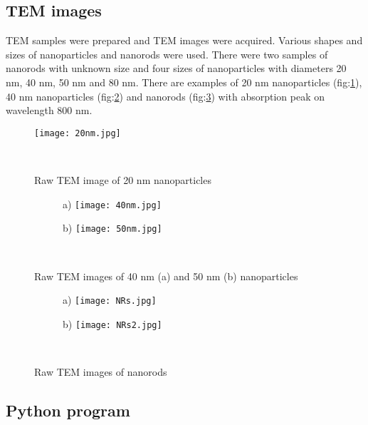 \pagestyle{plain}

\subsection{TEM images}\label{TEM_images}

TEM samples were prepared and TEM images were acquired. Various shapes and sizes of nanoparticles and nanorods were used. There were two samples of nanorods with unknown size and four sizes of nanoparticles with diameters 20 nm, 40 nm, 50 nm and 80 nm. There are examples of 20 nm nanoparticles (fig:\ref{fig:20nm}), 40 nm nanoparticles (fig:\ref{fig:40nm}) and nanorods (fig:\ref{fig:NRs}) with absorption peak on wavelength 800 nm.

\begin{figure}[h!]
\begin{center}
    \texttt{[image: 20nm.jpg]}
    \caption{Raw TEM image of 20 nm nanoparticles}~\label{fig:20nm}
\end{center}
\end{figure}

\begin{figure}[h!]
\begin{center}
\begin{subfigure}(a)
    \texttt{[image: 40nm.jpg]}
\end{subfigure}
\begin{subfigure}(b)
    \texttt{[image: 50nm.jpg]}
\end{subfigure}
\caption{Raw TEM images of 40 nm (a) and 50 nm (b) nanoparticles}~\label{fig:40nm}
\end{center}
\end{figure}

\begin{figure}[h!]
\begin{center}
\begin{subfigure}(a)
    \texttt{[image: NRs.jpg]}
\end{subfigure}
\begin{subfigure}(b)
    \texttt{[image: NRs2.jpg]}
\end{subfigure}
\caption{Raw TEM images of nanorods}~\label{fig:NRs}
\end{center}
\end{figure}

\subsection{Python program}\label{program}

